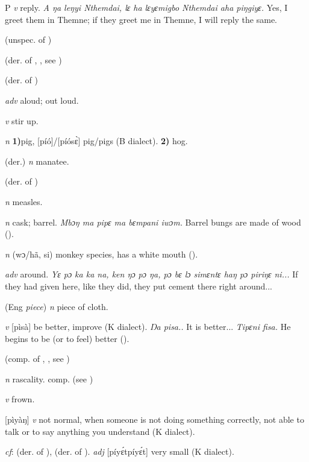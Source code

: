 \begin{letter}{P}
 \textit{v} reply. \textit{A ŋa leŋyi Nthemdai, lɛ ha lɛyɛmigbo Nthemdai aha piŋgiyɛ.} Yes, I greet them in Themne; if they greet me in Themne, I will reply the same.

 (unspec. of ) 

 (der. of , , see ) 

 (der. of ) 

 \textit{adv} aloud; out loud.

 \textit{v} stir up.

 \textit{n} \textbf{1)}pig, [píó]/[píósɛ̀] pig/pigs (B dialect). \textbf{2)} hog.

 (der.) \textit{n} manatee.

 (der. of ) 

 \textit{n} measles.

 \textit{n} cask; barrel. \textit{Mbɔŋ ma pipɛ ma bɛmpani iwɔm.} Barrel bungs are made of wood (\citealt{Pichl1967}).

 \textit{n} (wɔ/hã, si) monkey species, has a white mouth (\citealt{Pichl1967}). 

 \textit{adv} around. \textit{Yɛ pɔ ka ka na, ken ŋɔ pɔ ŋa, pɔ bɛ lɔ simɛntɛ haŋ pɔ piriŋɛ ni...} If they had given here, like they did, they put cement there right around...

 (Eng \textit{piece}) \textit{n} piece of cloth.

 \textit{v} [pìsà] be better, improve (K dialect). \textit{Ŋa pisa..} It is better... \textit{Tipɛni fisa.} He begins to be (or to feel) better (\citealt{Pichl1967}). 

 (comp. of , , see ) 

 \textit{n} rascality. comp.  (see )

 \textit{v} frown.

 [pìyàŋ] \textit{v} not normal, when someone is not doing something correctly, not able to talk or to say anything you understand (K dialect). 

 \textit{cf}:  (der. of ),  (der. of ). \textit{adj} [píyɛ́tpíyɛ́t] very small (K dialect). 


\end{letter}
